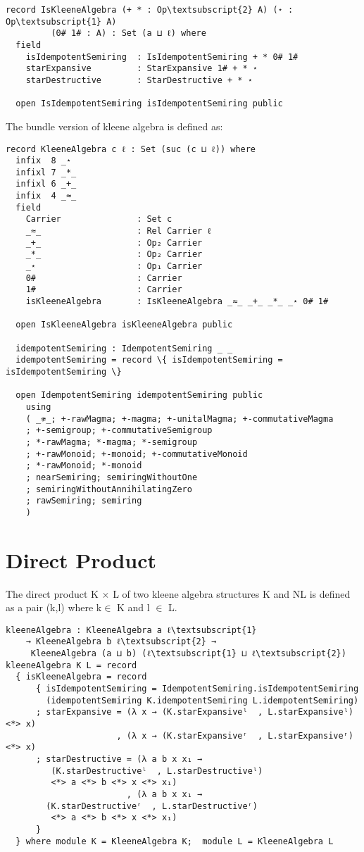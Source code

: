 \begin{Verbatim}[commandchars=\\\{\},samepage=true]
record IsKleeneAlgebra (+ * : Op\textsubscript{2} A) (⋆ : Op\textsubscript{1} A)
		 (0# 1# : A) : Set (a ⊔ ℓ) where
  field
    isIdempotentSemiring  : IsIdempotentSemiring + * 0# 1#
    starExpansive         : StarExpansive 1# + * ⋆
    starDestructive       : StarDestructive + * ⋆

  open IsIdempotentSemiring isIdempotentSemiring public
\end{Verbatim}
The bundle version of kleene algebra is defined as: 
\begin{Verbatim}[commandchars=\\\{\}]
record KleeneAlgebra c ℓ : Set (suc (c ⊔ ℓ)) where
  infix  8 _⋆
  infixl 7 _*_
  infixl 6 _+_
  infix  4 _≈_
  field
    Carrier               : Set c
    _≈_                   : Rel Carrier ℓ
    _+_                   : Op₂ Carrier
    _*_                   : Op₂ Carrier
    _⋆                    : Op₁ Carrier
    0#                    : Carrier
    1#                    : Carrier
    isKleeneAlgebra       : IsKleeneAlgebra _≈_ _+_ _*_ _⋆ 0# 1#

  open IsKleeneAlgebra isKleeneAlgebra public

  idempotentSemiring : IdempotentSemiring _ _
  idempotentSemiring = record \{ isIdempotentSemiring = isIdempotentSemiring \}

  open IdempotentSemiring idempotentSemiring public
    using
    ( _≉_; +-rawMagma; +-magma; +-unitalMagma; +-commutativeMagma
    ; +-semigroup; +-commutativeSemigroup
    ; *-rawMagma; *-magma; *-semigroup
    ; +-rawMonoid; +-monoid; +-commutativeMonoid
    ; *-rawMonoid; *-monoid
    ; nearSemiring; semiringWithoutOne
    ; semiringWithoutAnnihilatingZero
    ; rawSemiring; semiring
    )
\end{Verbatim}
\section{Direct Product}
The direct product K \(\times\) L of two kleene algebra structures K and NL is defined as a pair (k,l) where k\(\in\) K and l \(\in\) L.
\begin{Verbatim}
kleeneAlgebra : KleeneAlgebra a ℓ\textsubscript{1} 
	→ KleeneAlgebra b ℓ\textsubscript{2} →
	 KleeneAlgebra (a ⊔ b) (ℓ\textsubscript{1} ⊔ ℓ\textsubscript{2})
kleeneAlgebra K L = record
  { isKleeneAlgebra = record
      { isIdempotentSemiring = IdempotentSemiring.isIdempotentSemiring 
		(idempotentSemiring K.idempotentSemiring L.idempotentSemiring)
      ; starExpansive = (λ x → (K.starExpansiveˡ  , L.starExpansiveˡ) <*> x)
                      , (λ x → (K.starExpansiveʳ  , L.starExpansiveʳ) <*> x)
      ; starDestructive = (λ a b x x₁ →
		 (K.starDestructiveˡ  , L.starDestructiveˡ)
		 <*> a <*> b <*> x <*> x₁)
                        , (λ a b x x₁ → 
		(K.starDestructiveʳ  , L.starDestructiveʳ)
		 <*> a <*> b <*> x <*> x₁)
      }
  } where module K = KleeneAlgebra K;  module L = KleeneAlgebra L
\end{Verbatim}

